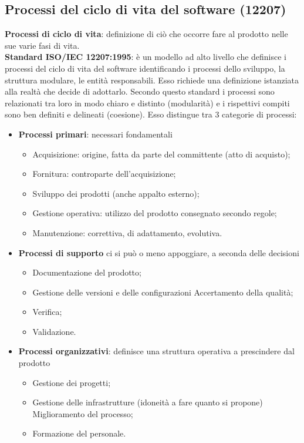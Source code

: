 \subsection{Processi del ciclo di vita del software (12207)}
\textbf{Processi di ciclo di vita}: definizione di ciò che occorre fare al prodotto nelle sue varie fasi di vita.\\
\textbf{Standard ISO/IEC 12207:1995}: è un modello ad alto livello che definisce i processi del ciclo di vita del software identificando i processi dello sviluppo, la struttura modulare, le entità responsabili. Esso richiede una definizione istanziata alla realtà che decide di adottarlo. Secondo questo standard i processi sono relazionati tra loro in modo chiaro e distinto (modularità) e i rispettivi compiti sono ben definiti e delineati (coesione).
Esso distingue tra 3 categorie di processi:
\begin{itemize}
\item \textbf{Processi primari}: necessari fondamentali
	\begin{itemize}
	\item Acquisizione: origine, fatta da parte del committente (atto di acquisto);
	\item Fornitura: controparte dell'acquisizione;
	\item Sviluppo dei prodotti (anche appalto esterno);
	\item Gestione operativa: utilizzo del prodotto consegnato secondo regole;
	\item Manutenzione: correttiva, di adattamento, evolutiva.
	\end{itemize}
\item \textbf{Processi di supporto} ci si può o meno appoggiare, a seconda delle decisioni 
	\begin{itemize}
	\item Documentazione del prodotto;
	\item Gestione delle versioni e delle configurazioni Accertamento della qualità;
	\item Verifica;
	\item Validazione.
	\end{itemize}
\item \textbf{Processi organizzativi}: definisce una struttura operativa a prescindere dal prodotto
	\begin{itemize}
	\item Gestione dei progetti;
	\item Gestione delle infrastrutture (idoneità a fare quanto si propone) Miglioramento del processo;
	\item Formazione del personale.
	\end{itemize}
\end{itemize}
